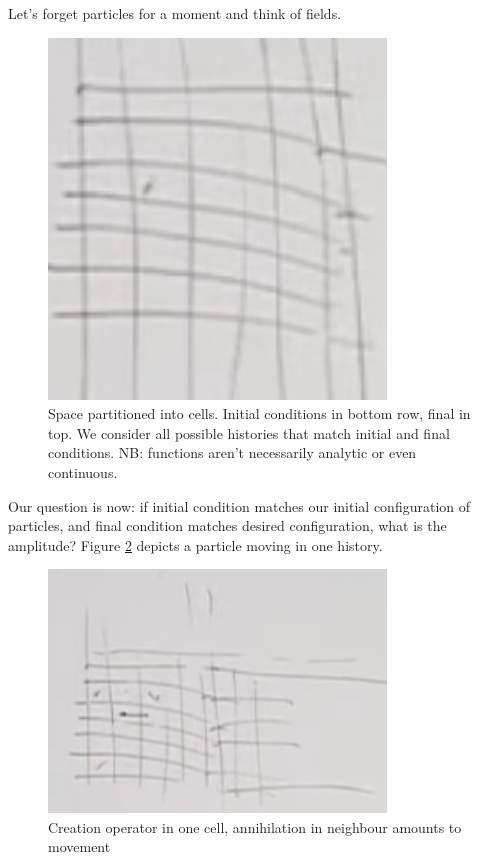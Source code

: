 \documentclass[]{article}
\begin{document}
Let's forget particles for a moment and think of fields.

\begin{figure}[H]
	\caption[Space partitioned into cells]{Space partitioned into cells. Initial conditions in bottom row, final in top. We consider all possible histories that match initial and final conditions. NB: functions aren't necessarily analytic or even continuous.}\label{fig:path-integral2}
	\includegraphics[width=0.8\textwidth]{path-integral2}
\end{figure}

Our question is now: if initial condition matches our initial configuration of particles, and final condition matches desired configuration, what is the amplitude? Figure \ref{fig:path-integral3} depicts a particle moving in one history.

\begin{figure}[H]
	\caption[Particle moving]{Creation operator in one cell, annihilation in neighbour amounts to movement}\label{fig:path-integral3}
	\includegraphics[width=0.8\textwidth]{path-integral3}
\end{figure}
\end{document}
